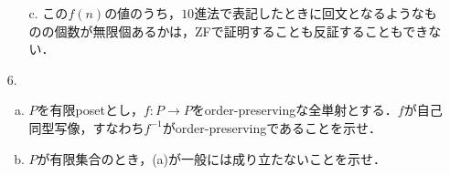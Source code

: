 \documentclass[xelatex,ja=standard,a4paper,14pt,everyparhook=compat]{bxjsarticle}
\theoremstyle{definition}
\begin{document}
\begin{enumerate}
\begin{enumerate}
              \item[c.] この$f(n)$の値のうち，$10$進法で表記したときに回文となるようなものの個数が無限個あるかは，ZFで証明することも反証することもできない．
          \end{enumerate}
    \item[6.] \begin{enumerate}[a.]
        \item $P$を有限posetとし，$f \colon P \to P$をorder-preservingな全単射とする．$f$が自己同型写像，すなわち$f^{-1}$がorder-preservingであることを示せ．
        \item $P$が有限集合のとき，(a)が一般には成り立たないことを示せ．
    \end{enumerate}
\end{enumerate}
\end{document}
